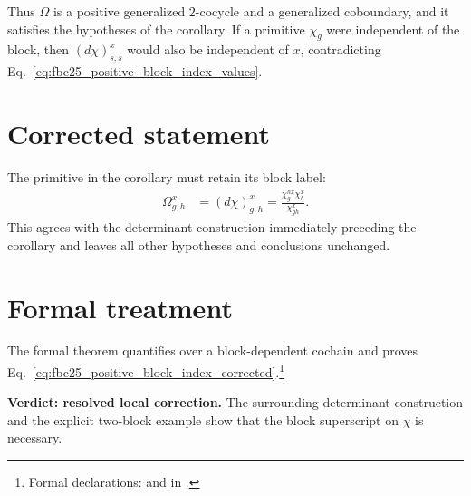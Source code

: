 \documentclass{article}
\begin{document}
Thus $\Omega$ is a positive generalized $2$-cocycle and a generalized
coboundary, and it satisfies the hypotheses of the corollary. If a primitive
$\chi_g$ were independent of the block, then $(d\chi)^x_{s,s}$ would also be
independent of $x$, contradicting
Eq.~\ref{eq:fbc25_positive_block_index_values}.

\section{Corrected statement}

The primitive in the corollary must retain its block label:
\begin{align}
    \Omega^x_{g,h}
        &=(d\chi)^x_{g,h}
          =\frac{\chi^{h x}_g\chi^x_h}{\chi^x_{gh}}.
    \label{eq:fbc25_positive_block_index_corrected}
\end{align}
This agrees with the determinant construction immediately preceding the
corollary and leaves all other hypotheses and conclusions unchanged.

\section{Formal treatment}

The formal theorem quantifies over a block-dependent cochain and proves
Eq.~\ref{eq:fbc25_positive_block_index_corrected}.\footnote{Formal
declarations:  and
 in
.}

\textbf{Verdict: resolved local correction.}
The surrounding determinant construction and the explicit two-block example
show that the block superscript on $\chi$ is necessary.



\end{document}
